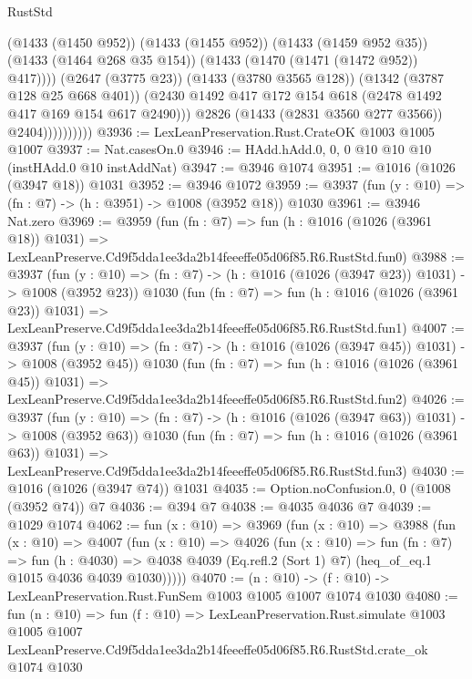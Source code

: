\begin{lexlean}{RustStd}
\begin{coremodule}
                              (@1433 (@1450 @952))
                              (@1433 (@1455 @952))
                              (@1433 (@1459 @952 @35))
                              (@1433 (@1464 @268 @35 @154))
                              (@1433 (@1470 (@1471 (@1472 @952)) @417))))
                          (@2647 (@3775 @23))
                          (@1433 (@3780 @3565 @128))
                          (@1342 (@3787 @128 @25 @668 @401))
                          (@2430 @1492 @417 @172 @154 @618 (@2478 @1492 @417 @169 @154 @617 @2490)))
                        @2826
                        (@1433 (@2831 @3560 @277 @3566))
                        @2404))))))))))
@3936 := LexLeanPreservation.Rust.CrateOK @1003 @1005 @1007
@3937 := Nat.casesOn.{0}
@3946 := HAdd.hAdd.{0, 0, 0} @10 @10 @10 (instHAdd.{0} @10 instAddNat)
@3947 := @3946 @1074
@3951 := @1016 (@1026 (@3947 @18)) @1031
@3952 := @3946 @1072
@3959 := @3937 (fun (y : @10) => (fn : @7) -> (h : @3951) -> @1008 (@3952 @18)) @1030
@3961 := @3946 Nat.zero
@3969 := @3959
    (fun (fn : @7) =>
    fun (h : @1016 (@1026 (@3961 @18)) @1031) =>
    LexLeanPreserve.Cd9f5dda1ee3da2b14feeeffe05d06f85.R6.RustStd.fun0)
@3988 := @3937
    (fun (y : @10) => (fn : @7) -> (h : @1016 (@1026 (@3947 @23)) @1031) -> @1008 (@3952 @23))
    @1030
    (fun (fn : @7) =>
    fun (h : @1016 (@1026 (@3961 @23)) @1031) =>
    LexLeanPreserve.Cd9f5dda1ee3da2b14feeeffe05d06f85.R6.RustStd.fun1)
@4007 := @3937
    (fun (y : @10) => (fn : @7) -> (h : @1016 (@1026 (@3947 @45)) @1031) -> @1008 (@3952 @45))
    @1030
    (fun (fn : @7) =>
    fun (h : @1016 (@1026 (@3961 @45)) @1031) =>
    LexLeanPreserve.Cd9f5dda1ee3da2b14feeeffe05d06f85.R6.RustStd.fun2)
@4026 := @3937
    (fun (y : @10) => (fn : @7) -> (h : @1016 (@1026 (@3947 @63)) @1031) -> @1008 (@3952 @63))
    @1030
    (fun (fn : @7) =>
    fun (h : @1016 (@1026 (@3961 @63)) @1031) =>
    LexLeanPreserve.Cd9f5dda1ee3da2b14feeeffe05d06f85.R6.RustStd.fun3)
@4030 := @1016 (@1026 (@3947 @74)) @1031
@4035 := Option.noConfusion.{0, 0} (@1008 (@3952 @74)) @7
@4036 := @394 @7
@4038 := @4035 @4036 @7
@4039 := @1029 @1074
@4062 := fun (x : @10) =>
  @3969
    (fun (x : @10) =>
    @3988
      (fun (x : @10) =>
      @4007
        (fun (x : @10) =>
        @4026
          (fun (x : @10) =>
          fun (fn : @7) =>
          fun (h : @4030) =>
          @4038 @4039 (Eq.refl.{2} (Sort 1) @7) (heq_of_eq.{1} @1015 @4036 @4039 @1030)))))
@4070 := (n : @10) -> (f : @10) -> LexLeanPreservation.Rust.FunSem @1003 @1005 @1007 @1074 @1030
@4080 := fun (n : @10) =>
  fun (f : @10) =>
  LexLeanPreservation.Rust.simulate
    @1003
    @1005
    @1007
    LexLeanPreserve.Cd9f5dda1ee3da2b14feeeffe05d06f85.R6.RustStd.crate_ok
    @1074
    @1030
\end{coremodule}
\end{lexlean}

